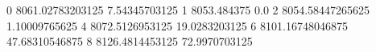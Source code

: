 0 8061.02783203125 7.54345703125
1 8053.484375 0.0
2 8054.58447265625 1.10009765625
4 8072.5126953125 19.0283203125
6 8101.16748046875 47.68310546875
8 8126.4814453125 72.9970703125
